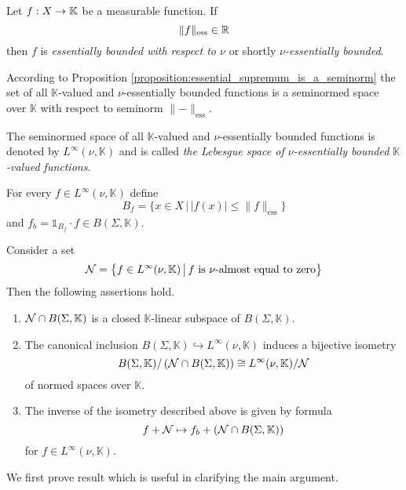 \begin{definition}
    Let $f:X\rightarrow \mathbb{K}$ be a measurable function. If
    $$\lVert f \rVert_{\mathrm{ess}} \in {\mathbb R}$$
    then $f$ is \textit{essentially bounded with respect to $\nu$} or shortly \textit{$\nu$-essentially bounded}.
\end{definition}
\noindent
According to Proposition \ref{proposition:essential_supremum_is_a_seminorm} the set of all $\mathbb{K}$-valued and $\nu$-essentially bounded functions is a seminormed space over $\mathbb{K}$ with respect to seminorm $\lVert-\rVert_{\mathrm{ess}}$.

\begin{definition}
    The seminormed space of all $\mathbb{K}$-valued and $\nu$-essentially bounded functions is denoted by $L^{\infty}(\nu,\mathbb{K})$ and is called \textit{the Lebesgue space of $\nu$-essentially bounded $\mathbb{K}$-valued functions}.
\end{definition}
\noindent
For every $f \in L^{\infty}(\nu,\mathbb{K})$ define
$$B_f = \big\{x \in X\,\big|\,|f(x)| \leq \lVert f \rVert_{\mathrm{ess}}\big\}$$
and $f_b = \mathbb{1}_{B_f}\cdot f \in B(\Sigma,\mathbb{K})$.

\begin{theorem}\label{theorem:canonical_isometry_of_quotients}
    Consider a set
    $${\mathcal N} = \big\{f\in L^{\infty}(\nu,\mathbb{K})\,\big|\,f\mbox{ is $\nu$-almost equal to zero}\big\}$$
    Then the following assertions hold.
    \begin{enumerate}[label=\emph{\textbf{(\arabic*)}}, leftmargin=*]
        \item ${\mathcal N}\cap B(\Sigma,\mathbb{K})$ is a closed $\mathbb{K}$-linear subspace of $B(\Sigma, \mathbb{K})$.
        \item The canonical inclusion $B(\Sigma, \mathbb{K})\hookrightarrow L^{\infty}(\nu,\mathbb{K})$ induces a bijective isometry
              $$B(\Sigma,\mathbb{K})/\left({\mathcal N}\cap B(\Sigma,\mathbb{K})\right) \cong L^{\infty}(\nu,\mathbb{K})/{\mathcal N}$$
              of normed spaces over $\mathbb{K}$. 
        \item The inverse of the isometry described above is given by formula 
        $$f + {\mathcal N} \mapsto f_b + \left({\mathcal N} \cap B(\Sigma, \mathbb{K})\right)$$
        for $f \in L^{\infty}(\nu,\mathbb{K})$.
    \end{enumerate}
\end{theorem}
\noindent
We first prove result which is useful in clarifying the main argument.

